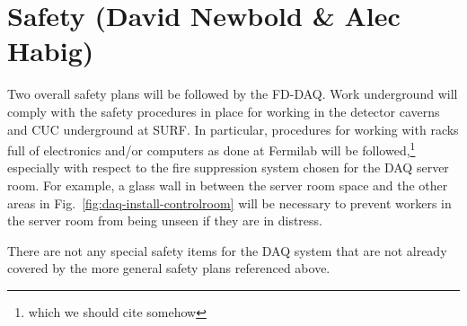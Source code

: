 

\section{Safety (David Newbold \& Alec Habig)}
\label{sec:fd-daq-safety}


Two overall safety plans will be followed by the FD-DAQ.  Work
underground will comply with the safety procedures in place for working
in the detector caverns and CUC underground at SURF.  In particular,
procedures for working with racks full of electronics and/or computers
as done at Fermilab will be followed,\footnote{which we should cite
  somehow}  especially with respect to the fire suppression system
chosen for the DAQ server room.  For example, a glass wall in between
the server room space and the other areas in
Fig.~\ref{fig:daq-install-controlroom} will be necessary to prevent
workers in the server room from being unseen if they are in distress.

There are not any special safety items for the DAQ system that are not
already covered by the more general safety plans referenced above. 





